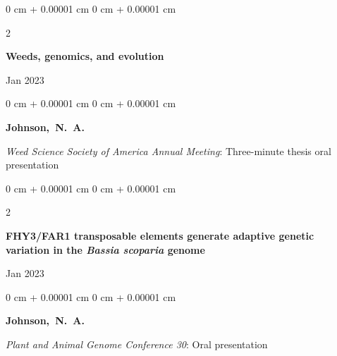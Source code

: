 \documentclass[10pt, letterpaper]{article}
\newenvironment{onecolentry}{
    \begin{adjustwidth}{
        0 cm + 0.00001 cm
    }{
        0 cm + 0.00001 cm
    }
}{
    \end{adjustwidth}
} %
\newenvironment{twocolentry}[2][]{
    \onecolentry
    \def\secondColumn{#2}
    \setcolumnwidth{\fill, 4.5 cm}
    \begin{paracol}{2}
}{
    \switchcolumn \raggedleft \secondColumn
    \end{paracol}
    \endonecolentry
} %
\begin{document}
        \vspace{0.2 cm}
        

        \begin{samepage}
            \begin{twocolentry}{
                Jan 2023
            }
                \textbf{Weeds, genomics, and evolution}
            \end{twocolentry}

            \vspace{0.10 cm}
            
            \begin{onecolentry}
                \mbox{\textbf{Johnson, N. A.}}

                \vspace{0.10 cm}
                
                \textit{Weed Science Society of America Annual Meeting}: Three-minute thesis oral presentation
            \end{onecolentry}
        \end{samepage} 


        \vspace{0.2 cm}
        

        \begin{samepage}
            \begin{twocolentry}{
                Jan 2023
            }
                \textbf{FHY3/FAR1 transposable elements generate adaptive genetic variation in the \textit{Bassia scoparia} genome}
            \end{twocolentry}

            \vspace{0.10 cm}
            
            \begin{onecolentry}
                \mbox{\textbf{Johnson, N. A.}}

                \vspace{0.10 cm}
                
                \textit{Plant and Animal Genome Conference 30}: Oral presentation
            \end{onecolentry}
        \end{samepage}      


        \vspace{0.2 cm}
        
\end{document}

